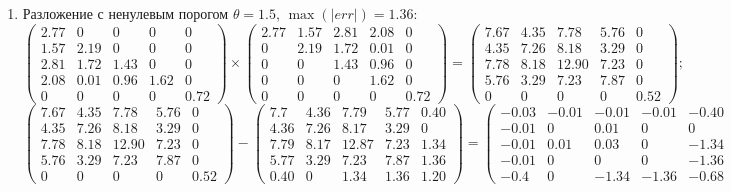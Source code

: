 \begin{enumerate}
    \item Разложение с ненулевым порогом $\theta=1.5$, $\max(|err|) = 1.36$:
    $$\begin{pmatrix}
        2.77&  0   & 0   & 0   & 0\\
        1.57&  2.19& 0   & 0   & 0\\
        2.81&  1.72& 1.43& 0   & 0\\
        2.08&  0.01& 0.96& 1.62& 0\\
        0   &  0   & 0   & 0   & 0.72
    \end{pmatrix} \times
    \begin{pmatrix}
        2.77&  1.57&  2.81&  2.08&   0\\
        0   &  2.19&  1.72&  0.01&   0   \\
        0   &  0   &  1.43&  0.96&   0\\
        0   &  0   &  0   &  1.62&   0\\
        0   &  0   &  0   &  0   &   0.72
    \end{pmatrix} =
    \begin{pmatrix}
        7.67&  4.35&   7.78&  5.76&  0\\
        4.35&  7.26&   8.18&  3.29&  0\\
        7.78&  8.18&  12.90&  7.23&  0\\
        5.76&  3.29&   7.23&  7.87&  0\\
        0   &  0   &   0   &  0   &  0.52
    \end{pmatrix};$$
    $$\begin{pmatrix}
        7.67&  4.35&   7.78&  5.76&  0\\
        4.35&  7.26&   8.18&  3.29&  0\\
        7.78&  8.18&  12.90&  7.23&  0\\
        5.76&  3.29&   7.23&  7.87&  0\\
        0   &  0   &   0   &  0   &  0.52
    \end{pmatrix} -
    \begin{pmatrix}
        7.7  & 4.36 & 7.79  & 5.77 & 0.40 \\
        4.36 & 7.26 & 8.17  & 3.29 & 0    \\
        7.79 & 8.17 & 12.87 & 7.23 & 1.34 \\
        5.77 & 3.29 & 7.23  & 7.87 & 1.36 \\
        0.40 & 0    & 1.34  & 1.36 & 1.20
    \end{pmatrix} =
    \begin{pmatrix}
        -0.03& -0.01& -0.01& -0.01& -0.40\\
        -0.01&  0   &  0.01&  0   &  0\\
        -0.01&  0.01&  0.03&  0   & -1.34\\
        -0.01&    0 &    0 &  0   & -1.36\\
        -0.4 &    0 & -1.34& -1.36& -0.68
    \end{pmatrix};$$
\end{enumerate}

